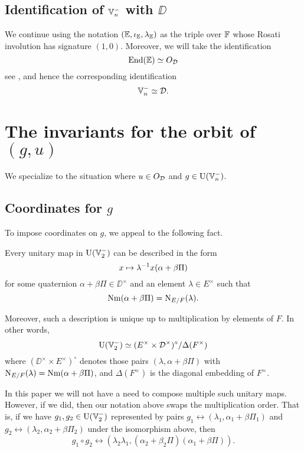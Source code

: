 \subsection{Identification of $\mathbb V_n^-$ with $\DD$}
We continue using the notation $(\mathbb E, \iota_\mathbb E, \lambda_\mathbb E)$ as the triple over $\mathbb F$
whose Rosati involution has signature $(1,0)$.
Moreover, we will take the identification
\[ \operatorname{End}(\mathbb E) \simeq O_\mathcal D \]
see \cite[Remark 2.5]{ref:KR},
and hence the corresponding identification
\[ \mathbb V_n^- \simeq \mathcal D. \]

\section{The invariants for the orbit of $(g,u)$}
\label{sec:g_u_invariants}

We specialize to the situation where $u \in O_\mathcal D$ and $g \in \operatorname{U}(\mathbb V_n^-)$.

\subsection{Coordinates for $g$}
To impose coordinates on $g$, we appeal to the following fact.
\begin{lemma}
  Every unitary map in $\operatorname{U}(\mathbb V_2^-)$ can be described in the form
  \[ x \mapsto \lambda^{-1} x (\alpha + \beta \Pi) \]
  for some quaternion $\alpha + \beta \Pi \in \DD^\times$
  and an element $\lambda \in E^\times$ such that
  \[ \operatorname{Nm}(\alpha + \beta \Pi) = \operatorname{N}_{E/F}(\lambda). \]

  Moreover, such a description is unique up to multiplication by elements of $F$.
  In other words,
  \[ \operatorname{U}(\mathbb V_2^-) \simeq (E^\times \times \mathcal D^\times)^\circ / \Delta(F^\times) \]
  where $(\DD^\times \times E^\times)^\circ$
  denotes those pairs $(\lambda, \alpha + \beta \Pi)$
  with $\operatorname{N}_{E/F}(\lambda) = \operatorname{Nm}(\alpha + \beta \Pi)$,
  and $\Delta(F^\times)$ is the diagonal embedding of $F^\times$.
\end{lemma}
\begin{remark}
  In this paper we will not have a need to compose multiple such unitary maps.
  However, if we did, then our notation above swaps the multiplication order.
  That is, if we have $g_1, g_2 \in \operatorname{U}(\mathbb V_2^-)$ represented by pairs
  $g_1 \leftrightarrow (\lambda_1, \alpha_1 + \beta \Pi_1)$
  and $g_2 \leftrightarrow (\lambda_2, \alpha_2 + \beta \Pi_2)$
  under the isomorphism above, then
  \[ g_1 \circ g_2 \leftrightarrow (\lambda_2 \lambda_1, (\alpha_2 + \beta_2 \Pi)(\alpha_1 + \beta \Pi)). \]
\end{remark}

